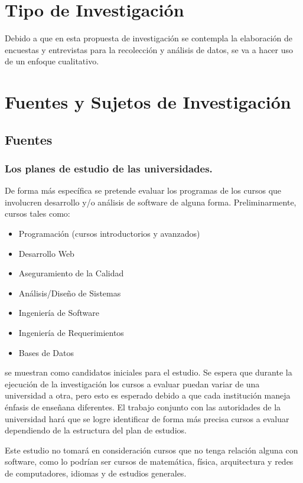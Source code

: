 \section{Tipo de Investigación}
Debido a que en esta propuesta de investigación se contempla la elaboración de encuestas y entrevistas para la recolección y análisis de datos, se va a hacer uso de un enfoque cualitativo.


\section{Fuentes y Sujetos de Investigación}

\subsection{Fuentes}

\subsubsection{Los planes de estudio de las universidades.} De forma más específica se pretende evaluar los programas de los cursos que involucren desarrollo y/o análisis de software de alguna forma. Preliminarmente, cursos tales como:
\begin{itemize}
    \item Programación (cursos introductorios y avanzados)
    \item Desarrollo Web
    \item Aseguramiento de la Calidad
    \item Análisis/Diseño de Sistemas
    \item Ingeniería de Software
    \item Ingeniería de Requerimientos
    \item Bases de Datos
\end{itemize}

se muestran como candidatos iniciales para el estudio. Se espera que durante la ejecución de la investigación los cursos a evaluar puedan variar de una universidad a otra, pero esto es esperado debido a que cada institución maneja énfasis de enseñana diferentes. El trabajo conjunto con las autoridades de la universidad hará que se logre identificar de forma más precisa cursos a evaluar dependiendo de la estructura del plan de estudios.

Este estudio no tomará en consideración cursos que no tenga relación alguna con software, como lo podrían ser cursos de matemática, física, arquitectura y redes de computadores, idiomas y de estudios generales.

